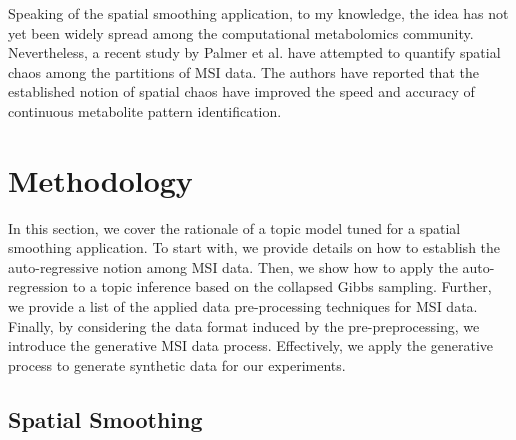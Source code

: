 \documentclass{mpaper}
\begin{document}
\par Speaking of the spatial smoothing application, to my knowledge, the idea has not yet been widely spread among the computational metabolomics community. Nevertheless, a recent study by Palmer et al. \cite{palmer2016fdr} have attempted to quantify spatial chaos among the partitions of MSI data. The authors have reported that the established notion of spatial chaos have improved the speed and accuracy of continuous metabolite pattern identification. 


\section{Methodology}

\par In this section, we cover the rationale of a topic model tuned for a spatial smoothing application. To start with, we provide details on how to establish the auto-regressive notion among MSI data. Then, we show how to apply the auto-regression to a topic inference based on the collapsed Gibbs sampling. Further, we provide a list of the applied data pre-processing techniques for MSI data. Finally, by considering the data format induced by the pre-preprocessing, we introduce the generative MSI data process. Effectively, we apply the generative process to generate synthetic data for our experiments.

\subsection{Spatial Smoothing}
\end{document}
